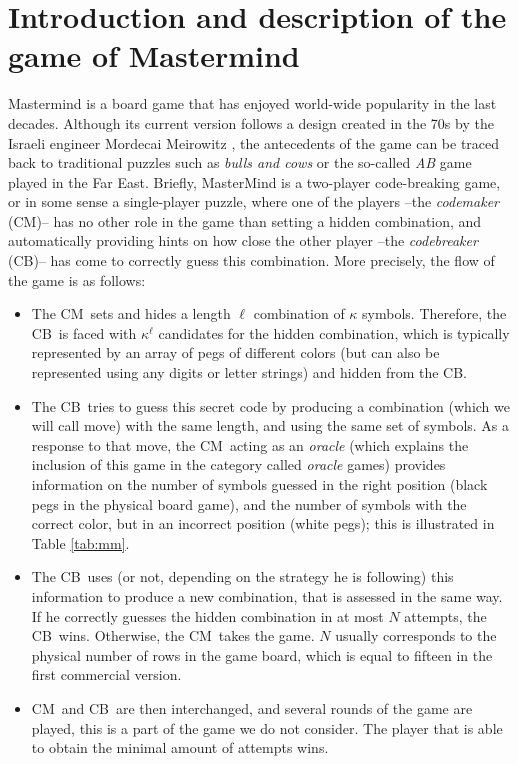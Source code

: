 \documentclass[preprint,12pt]{elsarticle}
\def\codemaker{CM}
\def\codebreaker{CB}
\begin{document}
\section{Introduction and description of the game of Mastermind}
\label{s:intro}

Mastermind \cite{mm:mathworld} is a board game that has enjoyed
world-wide popularity in the last decades. Although its current version
follows a design created in the 70s by the Israeli engineer Mordecai Meirowitz
\cite{wiki:mm}, the antecedents of the game can be
traced back 
to traditional puzzles such as \emph{bulls and cows} \cite{francisstrategies:moo} or the so-called \emph{AB}
\cite{Chen2007435} game played in the Far East. Briefly, MasterMind is a two-player
code-breaking game, or in some sense a single-player puzzle, where one of the
players --the \emph{codemaker} (\codemaker)-- has no other role in the game than
setting a hidden combination, and automatically providing hints on
how close the other player --the \emph{codebreaker} (\codebreaker)-- has
come to correctly guess this combination. More precisely, the flow of the game
is as follows:
\begin{itemize}

\item The \codemaker\  sets and hides a length $\ell$ combination of $\kappa$
  symbols. Therefore, the \codebreaker\ is faced with $\kappa^\ell$
  candidates for the hidden combination, which is typically
  represented by an array of pegs of different colors (but can also be
  represented using any digits or letter strings) and hidden from the
  \codebreaker. 

\item The \codebreaker\  tries to guess this secret code by
  producing a combination (which we will call move) with the same length, and using the same set
  of symbols. As a response to that move, the \codemaker\, acting as an
      {\em oracle} (which explains the inclusion of this game in the
      category called {\em oracle} games)
  provides information on the number of symbols guessed in the right
  position (black pegs in the physical board game), and the number of
  symbols with the correct color, but in an incorrect position (white
  pegs); this is illustrated in Table \ref{tab:mm}.

\item The \codebreaker\  uses (or not, depending on the strategy he is
      following) this information to produce a new combination,
  that is assessed in the same way. If he correctly guesses
  the hidden combination in at most $N$ attempts, the \codebreaker\
      wins. Otherwise,  the \codemaker\ takes the game. $N$ usually
      corresponds to the 
      physical number of rows in the  game board, which is equal to
      fifteen in the first commercial version.

 \item \codemaker\ and \codebreaker\ are then interchanged, and several rounds of the game
       are played, this is a part of the game we do not
       consider. The player that is able to obtain the minimal amount
       of attempts wins. 

\end{itemize}
\end{document}
